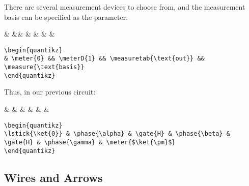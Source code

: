 \documentclass[aps,pra,10pt,nofootinbib]{revtex4}
\begin{document}
There are several measurement devices to choose from, and the measurement basis can be specified as the parameter:
\begin{Code}
\begin{center}
\begin{quantikz}
&  &&  & & & & 
\end{quantikz}
\end{center}
\tcblower
\begin{lstlisting}
\begin{quantikz}
& \meter{0} && \meterD{1} && \measuretab{\text{out}} && \measure{\text{basis}}
\end{quantikz}
\end{lstlisting}
\end{Code}
Thus, in our previous circuit:
\begin{Code}
\begin{center}
\begin{quantikz}
 & \phase{\alpha} &  & \phase{\beta} &  & \phase{\gamma} & \meter{$\ket{\pm}$}
\end{quantikz}
\end{center}
\tcblower
\begin{lstlisting}
\begin{quantikz}
\lstick{\ket{0}} & \phase{\alpha} & \gate{H} & \phase{\beta} & \gate{H} & \phase{\gamma} & \meter{$\ket{\pm}$}
\end{quantikz}
\end{lstlisting}
\end{Code}

\subsection{Wires and Arrows}
\end{document}
